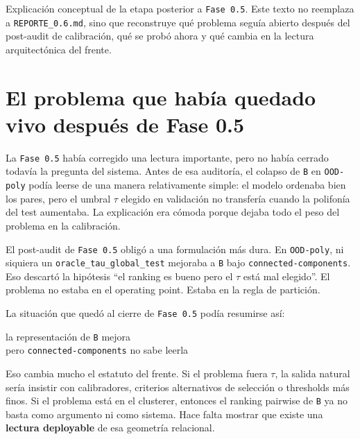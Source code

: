 \documentclass[11pt]{article}
\begin{document}

\begin{quietbox}
Explicación conceptual de la etapa posterior a \texttt{Fase 0.5}. Este texto no reemplaza a \texttt{REPORTE\_0.6.md}, sino que reconstruye qué problema seguía abierto después del post-audit de calibración, qué se probó ahora y qué cambia en la lectura arquitectónica del frente.
\end{quietbox}

\section{El problema que había quedado vivo después de Fase 0.5}

La \texttt{Fase 0.5} había corregido una lectura importante, pero no había cerrado todavía la pregunta del sistema. Antes de esa auditoría, el colapso de \texttt{B} en \texttt{OOD-poly} podía leerse de una manera relativamente simple: el modelo ordenaba bien los pares, pero el umbral $\tau$ elegido en validación no transfería cuando la polifonía del test aumentaba. La explicación era cómoda porque dejaba todo el peso del problema en la calibración.

El post-audit de \texttt{Fase 0.5} obligó a una formulación más dura. En \texttt{OOD-poly}, ni siquiera un \texttt{oracle\_tau\_global\_test} mejoraba a \texttt{B} bajo \texttt{connected-components}. Eso descartó la hipótesis ``el ranking es bueno pero el $\tau$ está mal elegido''. El problema no estaba en el operating point. Estaba en la regla de partición.

La situación que quedó al cierre de \texttt{Fase 0.5} podía resumirse así:

\begin{quietbox}
\sffamily la representación de \texttt{B} mejora\\
pero \texttt{connected-components} no sabe leerla
\end{quietbox}

Eso cambia mucho el estatuto del frente. Si el problema fuera $\tau$, la salida natural sería insistir con calibradores, criterios alternativos de selección o thresholds más finos. Si el problema está en el clusterer, entonces el ranking pairwise de \texttt{B} ya no basta como argumento ni como sistema. Hace falta mostrar que existe una \textbf{lectura deployable} de esa geometría relacional.
\end{document}
